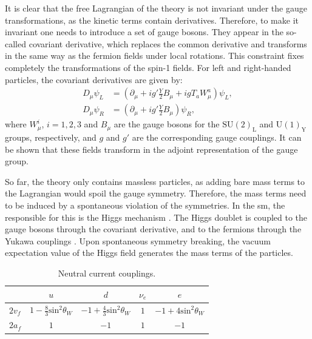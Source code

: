 It is clear that the free Lagrangian of the theory is not invariant under the gauge transformations, as the kinetic terms contain derivatives. Therefore, to make it invariant one needs to introduce a set of gauge bosons. They appear in the so-called covariant derivative, which replaces the common derivative and transforms in the same way as the fermion fields under local rotations. This constraint fixes completely the transformations of the spin-1 fields. For left and right-handed particles, the covariant derivatives are given by:
\begin{equation}
	\begin{split}
		D_{\mu} \psi_{L} &= \left(\partial_{\mu} + ig'\frac{Y}{2}B_{\mu}+igT_{a}W^{a}_{\mu}\right)\psi_{L},\\
		D_{\mu} \psi_{R} &= \left(\partial_{\mu} + ig'\frac{Y}{2}B_{\mu}\right)\psi_{R},
	\end{split}
\end{equation}
where $W^{i}_{\mu}$, $i=1,2,3$ and $B_{\mu}$ are the gauge bosons for the $\mathrm{SU}(2)_{\mathrm{L}}$ and $\mathrm{U}(1)_{\mathrm{Y}}$ groups, respectively, and $g$ and $g'$ are the corresponding gauge couplings. It can be shown that these fields transform in the adjoint representation of the gauge group.

So far, the theory only contains massless particles, as adding bare mass terms to the Lagrangian would spoil the gauge symmetry. Therefore, the mass terms need to be induced by a spontaneous violation of the symmetries. In the \gls{sm}, the responsible for this is the Higgs mechanism \cite{Englert1964,Higgs1964,Guralnik1964}. The Higgs doublet is coupled to the gauge bosons through the covariant derivative, and to the fermions through the Yukawa couplings \cite{Pich2012}. Upon spontaneous symmetry breaking, the vacuum expectation value of the Higgs field generates the mass terms of the particles.

\begin{table}[t]
	\centering
	\caption{Neutral current couplings.}
			\begin{tabular}{l|cccc}
					& $u$                                       & $d$                                        & $\nu_{e}$ & $e$                              \\[2mm] \hline
			\rule{0pt}{1.1\normalbaselineskip}$2v_{f}$ & $1-\frac{8}{3}\mathrm{sin}^{2}\theta_{W}$ & $-1+\frac{4}{3}\mathrm{sin}^{2}\theta_{W}$ & $1$       & $-1+4\mathrm{sin}^{2}\theta_{W}$ \\[2mm]
			$2a_{f}$ & $1$                                       & $-1$                                       & $1$       & $-1$                            
		\end{tabular}
	\label{tab:sm_nc_couplings}
\end{table}

